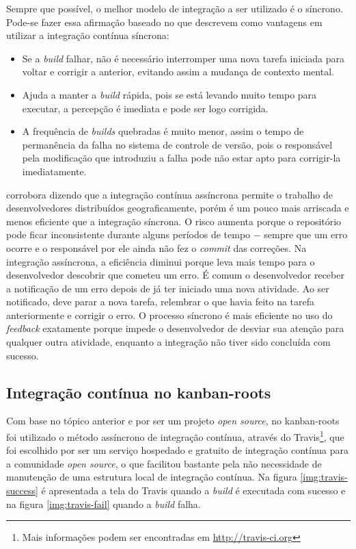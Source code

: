 Sempre que possível, o melhor modelo de integração a ser utilizado é o síncrono. Pode-se fazer essa afirmação baseado no que  descrevem como vantagens em utilizar a integração contínua síncrona:

\begin{itemize}
  \item Se a \textit{build} falhar, não é necessário interromper uma nova tarefa iniciada para voltar e corrigir a anterior, evitando assim a mudança de contexto mental.
  \item Ajuda a manter a \textit{build} rápida, pois se está levando muito tempo para executar, a percepção é imediata e pode ser logo corrigida.
  \item A frequência de \textit{builds} quebradas é muito menor, assim o tempo de permanência da falha no sistema de controle de versão, pois o responsável pela modificação que introduziu a falha pode não estar apto para corrigir-la imediatamente.
\end{itemize}

 corrobora dizendo que a integração contínua assíncrona permite o trabalho de desenvolvedores distribuídos geograficamente, porém é um pouco mais arriscada e menos eficiente que a integração síncrona. O risco aumenta porque o repositório pode ficar inconsistente durante alguns períodos de tempo $-$ sempre que um erro ocorre e o responsável por ele ainda não fez o \textit{commit} das correções. Na integração assíncrona, a eficiência diminui porque leva mais tempo para o desenvolvedor descobrir que cometeu um erro. É comum o desenvolvedor receber a notificação de um erro depois de já ter iniciado uma nova atividade. Ao ser notificado, deve parar a nova tarefa, relembrar o que havia feito na tarefa anteriormente e corrigir o erro. O processo síncrono é mais eficiente no uso do \textit{feedback} exatamente porque impede o desenvolvedor de desviar sua atenção para qualquer outra atividade, enquanto a integração não tiver sido concluída com sucesso.


\subsection{Integração contínua no kanban-roots}
\label{sub:integracao_continua_no_kanban}

Com base no tópico anterior e por ser um projeto \textit{open source}, no kanban-roots foi utilizado o método assíncrono de integração contínua, através do Travis\footnote{Mais informações podem ser encontradas em \url{http://travis-ci.org}}, que foi escolhido por ser um serviço hospedado e gratuito de integração contínua para a comunidade \textit{open source}, o que facilitou bastante pela não necessidade de manutenção de uma estrutura local de integração contínua. Na figura \ref{img:travis-success} é apresentada a tela do Travis quando a \textit{build} é executada com sucesso e na figura \ref{img:travis-fail} quando a \textit{build} falha.


